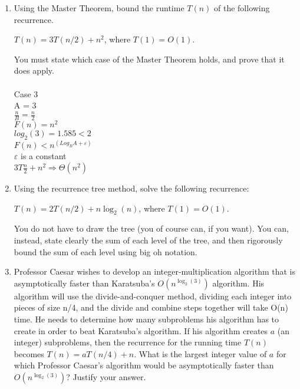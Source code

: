 \documentclass[11pt]{amsart}
\begin{document}
\begin{enumerate}
\bigskip

\item Using the Master Theorem, bound the runtime $T(n)$ of the following recurrence. 
\begin{center}
$T(n) = 3T(n/2) + n^2$, where $T(1) = O(1)$.
\end{center}
You must state which case of the Master Theorem holds, and prove that it does apply.
\\\\
Case 3\\
A = 3\\
$\frac{n}{B} = \frac{n}{2}$\\
$F(n) = n^2$\\
$log_2(3) = 1.585 < 2$\\
$F(n) < n^(Log_B A + \varepsilon)$\\
$\varepsilon$ is a constant\\
$3T\frac{n}{2} + n^2 \Rightarrow \Theta(n^2)$
\bigskip

\item Using the recurrence tree method, solve the following recurrence:
\begin{center}
$T(n) = 2T(n/2) + n\log_2(n)$, where $T(1) = O(1)$.
\end{center}
You do not have to draw the tree (you of course can, if you want). You can, instead, state clearly the sum of each level of the tree, and then rigorously bound the sum of each level using big oh notation.



\bigskip

\item Professor Caesar wishes to develop an integer-multiplication algorithm that is asymptotically faster than Karatsuba’s $O(n^{\log_2(3)})$ algorithm. His algorithm will use the divide-and-conquer method, dividing each integer into pieces of size n/4, and the divide and combine steps together will take O(n) time. He needs to determine how many subproblems his algorithm has to create in order to beat Karatsuba’s algorithm. If his algorithm creates $a$ (an integer) subproblems, then the recurrence for the running time $T(n)$ becomes $T(n) = aT(n/4) + n$. What is the largest integer value of $a$ for which Professor Caesar’s algorithm would be asymptotically faster than $O(n^{\log_2(3)})$? Justify your answer.

\end{enumerate}


\bigskip
\end{document}
